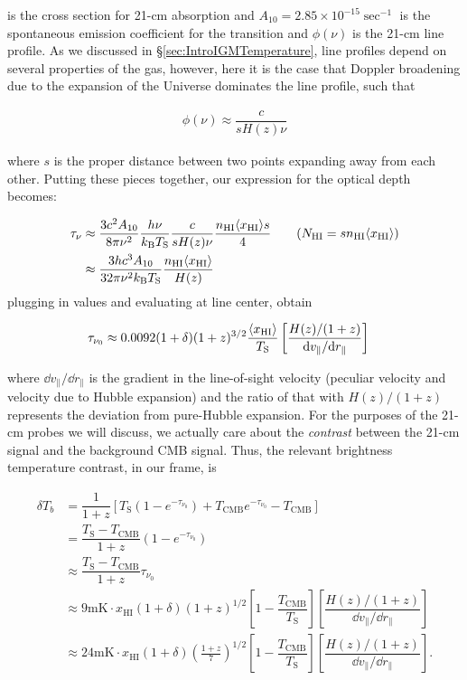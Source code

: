 is the cross section for 21-cm absorption and $A_{10} = 2.85 \times 10^{-15}\sec^{-1}$ is the spontaneous emission coefficient for the transition and $\phi(\nu)$ is the 21-cm line profile. As we discussed in \S \ref{sec:IntroIGMTemperature}, line profiles depend on several properties of the gas, however, here it is the case that Doppler broadening due to the expansion of the Universe dominates the line profile, such that

\begin{align}
\phi(\nu) \approx \dfrac{c}{s H(z) \nu}
\end{align}

where $s$ is the proper distance between two points expanding away from each other. Putting these pieces together, our expression for the optical depth becomes:

\begin{align}
\tau_{\nu} &\approx \dfrac{3c^2 A_{10}}{8\pi \nu^{2}} \dfrac{h \nu}{k_{\text{B}}T_{\text{S}}} \dfrac{c}{s H(z) \nu} \dfrac{n_{\text{HI}}\langle x_{\text{HI}}\rangle s}{4} \tag{$N_{\text{HI}} = s n_{\text{HI}}\axhi$}\\
&\approx \dfrac{3hc^3 A_{10}}{32\pi \nu^2 k_{\text{B}}T_{\text{S}}} \dfrac{n_{\text{HI}}\axhi}{H(z)}
\end{align}
plugging in values and evaluating at line center, \citet{Furlanetto2006} obtain

\begin{align}
\tau_{\nu_{0}} &\approx 0.0092 (1+\delta)(1+z)^{3/2}\dfrac{\langle x_{\text{HI}}\rangle}{T_{\text{S}}}\left[ \dfrac{H(z)/(1+z)}{\text{d} v_{\parallel}/\text{d} r_{\parallel}} \right] 
\end{align}

where $\dd v_{\parallel}/\dd r_{\parallel}$ is the gradient in the line-of-sight velocity (peculiar velocity and velocity due to Hubble expansion) and the ratio of that with $H(z)/(1+z)$ represents the deviation from pure-Hubble expansion. For the purposes of the 21-cm probes we will discuss, we actually care about the \textit{contrast} between the 21-cm signal and the background CMB signal. Thus, the relevant brightness temperature contrast, in our frame, is 

\begin{align}
\delta T_{b} &= \dfrac{1}{1+z}\left[ T_{\text{S}}(1-e^{-\tau_{\nu_{0}}}) + T_{\text{CMB}}e^{-\tau_{\nu_{0}}} - T_{\text{CMB}} \right] \\
&= \dfrac{T_{\text{S}}-T_{\text{CMB}}}{1+z} (1 - e^{-\tau_{\nu_{0}}}) \\
&\approx \dfrac{T_{\text{S}}-T_{\text{CMB}}}{1+z} \tau_{\nu_{0}} \\ 
&\approx 9\text{mK}\cdot x_{\text{HI}}(1+\delta)(1+z)^{1/2}\left[ 1 - \dfrac{T_{\text{CMB}}}{T_{\text{S}}} \right] \left[ \dfrac{H(z)/(1+z)}{\dd v_{\parallel}/ \dd r_{\parallel}} \right] \\ 
&\approx 24 \text{mK}\cdot x_{\text{HI}}(1+\delta)\left(\frac{1+z}{7}\right)^{1/2}\left[ 1 - \dfrac{T_{\text{CMB}}}{T_{\text{S}}} \right] \left[ \dfrac{H(z)/(1+z)}{\dd v_{\parallel}/ \dd r_{\parallel}} \right]. \label{eq:dTb}
\end{align}

